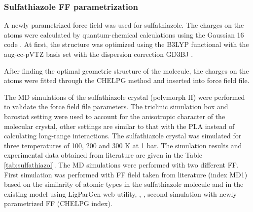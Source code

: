 \subsubsection{Sulfathiazole FF parametrization}
A newly parametrized force field \cite{jorgensen_development_1996} was used for sulfathiazole. The charges on the atoms were calculated by quantum-chemical calculations using the Gaussian 16 code \cite{frisch_gaussian16_2016}. At first, the structure was optimized using the B3LYP functional with the aug-cc-pVTZ basis set with the dispersion correction GD3BJ \cite{smith_revised_2016}.

After finding the optimal geometric structure of the molecule, the charges on the atoms were fitted through the CHELPG\cite{breneman_determining_1990} method and inserted into force field file.

The MD simulations of the sulfathiazole crystal (polymorph II) were performed to validate the force field file parameters. The triclinic simulation box and barostat setting were used to account for the anisotropic character of the molecular crystal, other settings are similar to that with the PLA instead of calculating long-range interactions. The sulfathiazole crystal was simulated for three temperatures of 100, 200 and 300 K at 1 bar. The simulation results and experimental data obtained from literature \cite{drebushchak_crystal_2008} are given in the Table \ref{tab:sulfathiazol}. The MD simulations were performed with two different FF. First simulation was performed with FF field taken from literature (index MD1) based on the similarity of atomic types in the sulfathiazole molecule and in the existing model using LigParGen web utility\cite{dodda_ligpargen_2017}, \cite{jorgensen_potential_2005}, \cite{dodda_114cm1a-lbcc_2017}, second simulation with newly parametrized FF (CHELPG index). 

